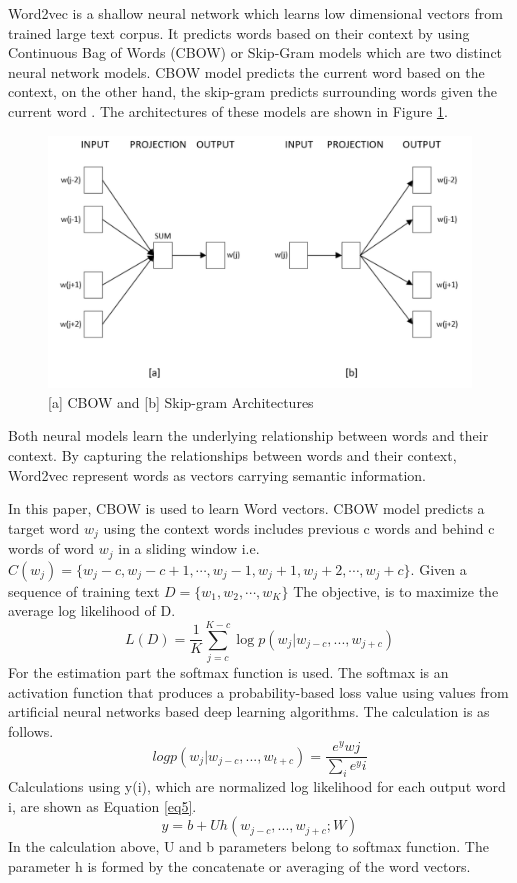 \documentclass[a4paper,fleqn]{cas-dc}
\begin{document}
Word2vec \citep{ref2} is a shallow neural network which learns low dimensional vectors from trained large text corpus. It predicts words based on their context by using Continuous Bag of Words (CBOW) or Skip-Gram models which are two distinct neural network models. CBOW model predicts the current word based on the context, on the other hand, the skip-gram predicts surrounding words given the current word \citep{ref2}. The architectures of these models are shown in Figure \ref{fig2}.  %

\begin{figure}
	\centering
	\includegraphics[scale=.3]{figs/fig2.pdf}
	\caption{ [a] CBOW and [b] Skip-gram Architectures \cite{ref2}}
	\label{fig2}
\end{figure}
Both neural models learn the underlying relationship between words and their context. By capturing the relationships between words and their context, Word2vec represent words as vectors carrying semantic information. 

In this paper, CBOW is used to learn Word vectors. CBOW model predicts a target word $w_j$ using the context words includes previous c words and behind c words of word $w_j$ in a sliding window i.e. $ C ( w_j  )= \{  w_j  - c, w_j  - c + 1, \cdots , w_j - 1, w_j  + 1, w_j + 2, \cdots , w_j  + c \}$. Given a sequence of training text $ D= \{w_1, w_2, \cdots, w_K \}$ The objective, is to maximize the average log likelihood of D. 
\begin{equation}
\label{eq3}
L(D)=\frac{1}{K} \sum_{j=c}^{K-c}\log {p(w_j | w_{j-c},...,w_{j+c})}        
\end{equation}
For the estimation part the softmax function is used. The softmax is an activation function that produces a probability-based loss value using values from artificial neural networks based deep learning algorithms. The calculation is as follows.
\begin{equation}
\label{eq4}
log {p(w_j | w_{j-c},...,w_{t+c})} =\frac{e^yw{j}}{\sum_{i}e^yi}        
\end{equation}
Calculations using y(i), which are normalized log likelihood for each output word i, are shown as Equation \ref{eq5}.
\begin{equation}
\label{eq5}
y = b+Uh(w_{j-c},...,w_{j+c};W)         
\end{equation}
In the calculation above, U and b parameters belong to softmax function. The parameter h is formed by the concatenate or averaging of the word vectors.
\end{document}
